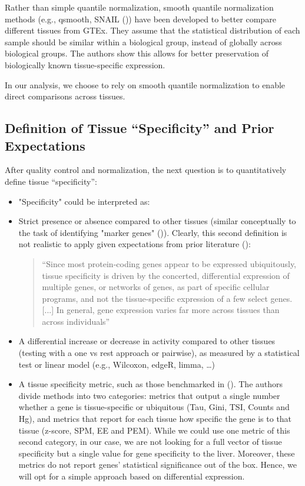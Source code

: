 \documentclass{article}
\begin{document}
Rather than simple quantile normalization, smooth quantile normalization methods (e.g., qsmooth, SNAIL (\cite{Hicks2018-gi,Hsieh2023-jf})) have been developed to better compare different tissues from GTEx. They assume that the statistical distribution of each sample should be similar within a biological group, instead of globally across biological groups. The authors show this allows for better preservation of biologically known tissue-specific expression.

In our analysis, we choose to rely on smooth quantile normalization to enable direct comparisons across tissues.

\subsection{Definition of Tissue “Specificity” and Prior Expectations}

After quality control and normalization, the next question is to quantitatively define tissue “specificity”:
\begin{itemize}
  \item "Specificity" could be interpreted as:
  \item Strict presence or absence compared to other tissues (similar conceptually to the task of identifying "marker genes" (\cite{Pullin2024-xv})). Clearly, this second definition is not realistic to apply given expectations from prior literature (\cite{Aguet2016-qm}):
  \begin{quote}
    “Since most protein-coding genes appear to be expressed ubiquitously, tissue specificity is driven by the concerted, differential expression of multiple genes, or networks of genes, as part of specific cellular programs, and not the tissue-specific expression of a few select genes. [...] In general, gene expression varies far more across tissues than across individuals”
  \end{quote}
  \item A differential increase or decrease in activity compared to other tissues (testing with a one vs rest approach or pairwise), as measured by a statistical test or linear model (e.g., Wilcoxon, edgeR, limma, …)
  \item A tissue specificity metric, such as those benchmarked in (\cite{Kryuchkova-Mostacci2017-vy}). The authors divide methods into two categories: metrics that output a single number whether a gene is tissue-specific or ubiquitous (Tau, Gini, TSI, Counts and Hg), and metrics that report for each tissue how specific the gene is to that tissue (z-score, SPM, EE and PEM). While we could use one metric of this second category, in our case, we are not looking for a full vector of tissue specificity but a single value for gene specificity to the liver. Moreover, these metrics do not report genes' statistical significance out of the box. Hence, we will opt for a simple approach based on differential expression.
\end{itemize}
\end{document}
